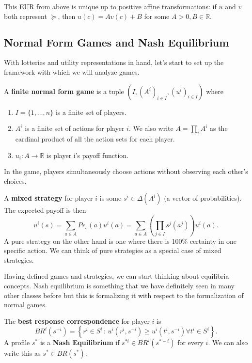 \documentclass[11pt,english]{article}
\begin{document}
\begin{theorem}
This EUR from above is unique up to positive affine transformations: if $u$ and $v$ both represent $\succeq$, then $u(c) = Av(c) + B$ for some $A > 0, B\in \mathbb{R}$. 
\end{theorem}

\subsection{Normal Form Games and Nash Equilibrium}
With lotteries and utility representations in hand, let's start to set up the framework with which we will analyze games. 
\begin{definition}
A \textbf{finite normal form game} is a tuple $(I, (A^i)_{i\in I}, (u^i)_{i\in I})$ where 
\begin{enumerate}
\item $I = \{1,\ldots, n\}$ is a finite set of players.
\item $A^i$ is a finite set of actions for player $i$. We also write $A = \prod_iA^i$ as the cardinal product of all the action sets for each player.
\item $u_i:A \to \mathbb{R}$ is player i's payoff function. 
\end{enumerate}
In the game, players simultaneously choose actions without observing each other's choices.

A \textbf{mixed strategy} for player $i$ is some $s^i \in \Delta(A^i)$ (a vector of probabilities). The expected payoff is then $$u^i(s) = \sum_{a\in A}Pr_s(a)u^i(a) = \sum_{a\in A} \left(\prod_{j\in I} s^j(a^j)\right)u^i(a).$$ A pure strategy on the other hand is one where there is 100\% certainty in one specific action. We can think of pure strategies as a special case of mixed strategies.
\end{definition}

Having defined games and strategies, we can start thinking about equilibria concepts. Nash equilibrium is something that we have definitely seen in many other classes before but this is formalizing it with respect to the formalization of normal games.
\begin{definition}
The \textbf{best response correspondence} for player $i$ is $$BR^i(s^{-i}) = \left\{r^i\in S^i\,:\,u^i(r^i, s^{-i}) \geq u^i(t^i, s^{-i}) \forall t^i \in S^i\right\}.$$A profile $s^*$ is a \textbf{Nash Equilibrium} if $s^{*i}\in BR^i(s^{*-i})$ for every $i$. We can also write this as $s^* \in BR(s^*)$.
\end{definition}
\end{document}
